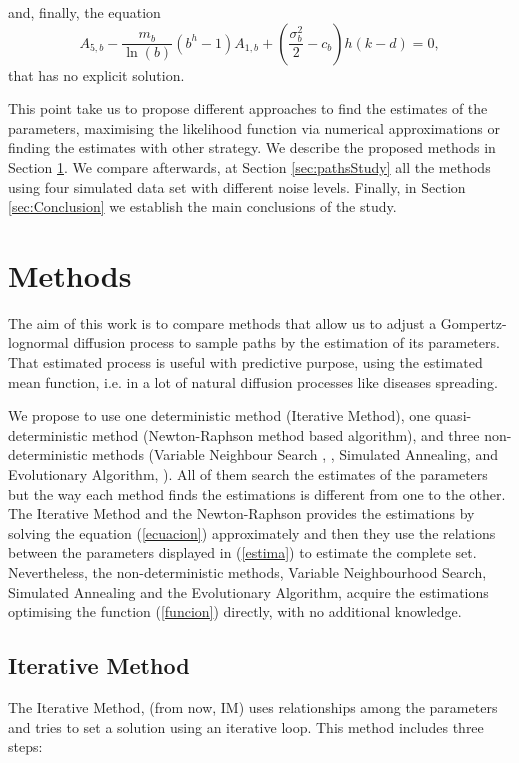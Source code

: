 \documentclass{sig-alternate}
\begin{document}
\noindent and, finally, the equation
\begin{equation}\label{ecuacion}
    A_{5,b}-\frac{m_b}{\ln(b)}(b^h-1)A_{1,b}+\left(\frac{\sigma_b^2}{2}-c_b\right)h(k-d)=0 ,
\end{equation}
that has no explicit solution.

This point take us to propose different approaches to find the estimates of the parameters, maximising the likelihood function via numerical approximations or finding the estimates with other strategy. We describe the proposed methods in Section \ref{sec:methods}. We compare afterwards, at Section \ref{sec:pathsStudy} all the methods using four simulated data set with different noise levels. Finally, in Section \ref{sec:Conclusion} we establish the main conclusions of the study.



\section{Methods}
\label{sec:methods}

The aim of this work is to compare methods that allow us to adjust a Gompertz-lognormal diffusion process to sample paths by the estimation of its parameters. That estimated process is useful with predictive purpose, using the estimated mean function, i.e. in a lot of natural diffusion processes like diseases spreading.

We propose to use one deterministic method (Iterative Method), one quasi-deterministic method (Newton-Raphson method based algorithm), and three non-deterministic methods (Variable Neighbour Search , \cite{VNS}, Simulated Annealing, \cite{SA} and Evolutionary Algorithm, \cite{EA}). All of them search the estimates of the parameters but the way each method finds the estimations is different from one to the other. The Iterative Method and the Newton-Raphson  provides the estimations by solving the equation (\ref{ecuacion}) approximately and then they use the relations between the parameters displayed in (\ref{estima}) to estimate the complete set. Nevertheless, the non-deterministic methods, Variable Neighbourhood Search, Simulated Annealing and the Evolutionary Algorithm, acquire the estimations optimising the function (\ref{funcion}) directly, with no additional knowledge.


\subsection{Iterative Method}
\label{subsec:iterative}
The Iterative Method, (from now, IM) uses relationships among the parameters and tries to set a solution using an iterative loop.  This method includes three steps:
\end{document}
